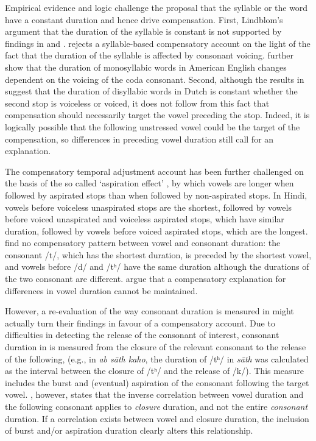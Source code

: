 \documentclass[preprint]{JASAnew}
\begin{document}
Empirical evidence and logic challenge the proposal that the syllable or
the word have a constant duration and hence drive compensation. First,
Lindblom's \citeyearpar{lindblom1967} argument that the duration of the
syllable is constant is not supported by findings in \citet{chen1970}
and \citet{jacewicz2009}. \citet{chen1970} rejects a syllable-based
compensatory account on the light of the fact that the duration of the
syllable is affected by consonant voicing. \citet{jacewicz2009} further
show that the duration of monosyllabic words in American English changes
dependent on the voicing of the coda consonant. Second, although the
results in \citet{slis1969} suggest that the duration of disyllabic
words in Dutch is constant whether the second stop is voiceless or
voiced, it does not follow from this fact that compensation should
necessarily target the vowel preceding the stop. Indeed, it is logically
possible that the following unstressed vowel could be the target of the
compensation, so differences in preceding vowel duration still call for
an explanation.

The compensatory temporal adjustment account has been further challenged
on the basis of the so called `aspiration effect' \citep{maddieson1976},
by which vowels are longer when followed by aspirated stops than when
followed by non-aspirated stops. In Hindi, vowels before voiceless
unaspirated stops are the shortest, followed by vowels before voiced
unaspirated and voiceless aspirated stops, which have similar duration,
followed by vowels before voiced aspirated stops, which are the longest.
\citet{maddieson1976} find no compensatory pattern between vowel and
consonant duration: the consonant /t/, which has the shortest duration,
is preceded by the shortest vowel, and vowels before /d/ and /tʰ/ have
the same duration although the durations of the two consonant are
different. \citet{maddieson1976} argue that a compensatory explanation
for differences in vowel duration cannot be maintained.

However, a re-evaluation of the way consonant duration is measured in
\citet{maddieson1976} might actually turn their findings in favour of a
compensatory account. Due to difficulties in detecting the release of
the consonant of interest, consonant duration in \citet{maddieson1976}
is measured from the closure of the relevant consonant to the release of
the following, (e.g., in \emph{ab sāth kaho}, the duration of /tʰ/ in
\emph{sāth} was calculated as the interval between the closure of /tʰ/
and the release of /k/). This measure includes the burst and (eventual)
aspiration of the consonant following the target vowel.
\citet{slis1969a}, however, states that the inverse correlation between
vowel duration and the following consonant applies to \emph{closure}
duration, and not the entire \emph{consonant} duration. If a correlation
exists between vowel and closure duration, the inclusion of burst and/or
aspiration duration clearly alters this relationship.
\end{document}
